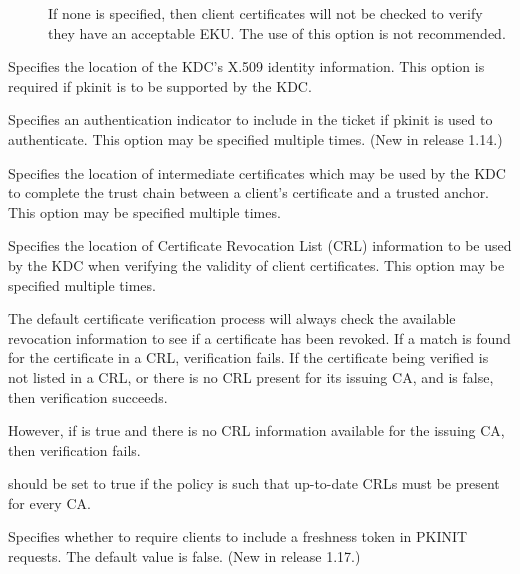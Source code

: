 \documentclass[letterpaper,10pt,english]{sphinxmanual}
\begin{document}
\begin{description}
\begin{description}
\item[{}] \leavevmode
If none is specified, then client certificates will not be
checked to verify they have an acceptable EKU.  The use of
this option is not recommended.

\end{description}

\item[{\sphinxstylestrong{pkinit\_identity}}] \leavevmode
Specifies the location of the KDC’s X.509 identity information.
This option is required if pkinit is to be supported by the KDC.

\item[{\sphinxstylestrong{pkinit\_indicator}}] \leavevmode
Specifies an authentication indicator to include in the ticket if
pkinit is used to authenticate.  This option may be specified
multiple times.  (New in release 1.14.)

\item[{\sphinxstylestrong{pkinit\_pool}}] \leavevmode
Specifies the location of intermediate certificates which may be
used by the KDC to complete the trust chain between a client’s
certificate and a trusted anchor.  This option may be specified
multiple times.

\item[{\sphinxstylestrong{pkinit\_revoke}}] \leavevmode
Specifies the location of Certificate Revocation List (CRL)
information to be used by the KDC when verifying the validity of
client certificates.  This option may be specified multiple times.

\item[{\sphinxstylestrong{pkinit\_require\_crl\_checking}}] \leavevmode
The default certificate verification process will always check the
available revocation information to see if a certificate has been
revoked.  If a match is found for the certificate in a CRL,
verification fails.  If the certificate being verified is not
listed in a CRL, or there is no CRL present for its issuing CA,
and  is false, then verification
succeeds.

However, if  is true and there is
no CRL information available for the issuing CA, then verification
fails.

 should be set to true if the
policy is such that up-to-date CRLs must be present for every CA.

\item[{\sphinxstylestrong{pkinit\_require\_freshness}}] \leavevmode
Specifies whether to require clients to include a freshness token
in PKINIT requests.  The default value is false.  (New in release
1.17.)

\end{description}
\end{document}
